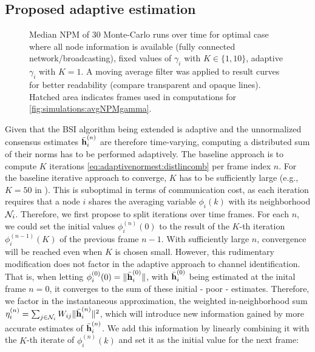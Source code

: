 \documentclass{article}
\begin{document}
\subsection[]{Proposed adaptive estimation}
\begin{figure}[t]
    \centering
    
    \vspace*{-0.6cm}
    \caption[]{Median NPM of 30 Monte-Carlo runs over time for optimal case where all node information is available (fully connected network/broadcasting), fixed values of \(\gamma_i\) with \(K \in \{1,10\}\), adaptive \(\gamma_i\) with \(K=1\). A moving average filter was applied to result curves for better readability (compare transparent and opaque lines). Hatched area indicates frames used in computations for \autoref{fig:simulations:avgNPMgamma}.}
    \label{fig:simulations:NPMtime}
\end{figure}
Given that the BSI algorithm being extended \cite{blochbergerDBSI} is adaptive and the unnormalized consensus estimates \(\bar{\bm{\mathrm{h}}}_i^{(n)}\) are therefore time-varying, computing a distributed sum of their norms has to be performed adaptively.
The baseline approach is to compute \(K\) iterations \eqref{eq:adaptivenormest:distlincomb} per frame index \(n\).
For the baseline iterative approach to converge, \(K\) has to be sufficiently large (e.g., \(K=50\) in \cite{yuDistributedBlindSystem2014,liuDistributedBlindIdentification2016}).
This is suboptimal in terms of communication cost, as each iteration requires that a node \(i\) shares the averaging variable \(\phi_i(k)\) with its neighborhood \(\mathcal{N}_i\).
Therefore, we first propose to split iterations over time frames.
For each \(n\), we could set the initial values \(\phi_i^{(n)}(0)\) to the result of the \(K\)-th iteration \(\phi_i^{(n-1)}(K)\) of the previous frame \(n-1\).
With sufficiently large \(n\), convergence will be reached even when \(K\) is chosen small.
However, this rudimentary modification does not factor in the adaptive approach to channel identification.
That is, when letting \(\phi_i^{(0)}(0) = \|\bar{\bm{\mathrm{h}}}_i^{(0)}\|\), with \(\bar{\bm{\mathrm{h}}}_i^{(0)}\) being estimated at the inital frame \(n=0\), it converges to the sum of these initial - poor - estimates.
Therefore, we factor in the instantaneous approximation, the weighted in-neighborhood sum \(\eta_i^{(n)} = \sum_{j \in \mathcal{N}_i} W_{ij} \|\bar{\bm{\mathrm{h}}}_i^{(n)}\|^2\), which will introduce new information gained by more accurate estimates of \(\bar{\bm{\mathrm{h}}}_i^{(n)}\).
We add this information by linearly combining it with the \(K\)-th iterate of \(\phi_i^{(n)}(k)\) and set it as the initial value for the next frame:
\end{document}
